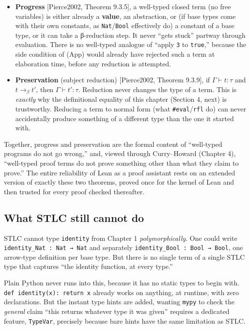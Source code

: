 \begin{itemize}
\tightlist
\item
  \textbf{Progress} {[}Pierce2002, Theorem 9.3.5{]}, a well-typed closed term (no free variables) is either already a \textbf{value}, an abstraction, or (if base types come with their own constants, as \texttt{Nat}/\texttt{Bool} effectively do) a constant of a base type, or it can take a β-reduction step. It never ``gets stuck'' partway through evaluation. There is no well-typed analogue of ``apply \texttt{3} to \texttt{true},'' because the side condition of (App) would already have rejected such a term at elaboration time, before any reduction is attempted.
\item
  \textbf{Preservation} (subject reduction) {[}Pierce2002, Theorem 9.3.9{]}, if \(\Gamma \vdash t : \tau\) and \(t \longrightarrow_\beta t'\), then \(\Gamma \vdash t' : \tau\). Reduction never changes the type of a term. This is \emph{exactly} why the definitional equality of this chapter (Section 4, next) is trustworthy. Reducing a term to normal form (what \texttt{\#eval}/\texttt{rfl} do) can never accidentally produce something of a different type than the one it started with.
\end{itemize}

Together, progress and preservation are the formal content of ``well-typed programs do not go wrong,'' and, viewed through Curry--Howard (Chapter 4), ``well-typed proof terms do not prove something other than what they claim to prove.'' The entire reliability of Lean as a proof assistant rests on an extended version of exactly these two theorems, proved once for the kernel of Lean and then trusted for every proof checked thereafter.

\subsection{What STLC still cannot do}\label{sec:06-rigor-check:03-typing-rules-and-safety:5}

STLC cannot type \texttt{identity} from Chapter 1 \emph{polymorphically}. One could write \texttt{identity\_\allowbreak{}Nat : Nat → Nat} and separately \texttt{identity\_\allowbreak{}Bool : Bool → Bool}, one arrow-type definition per base type. But there is no single term of a single STLC type that captures ``the identity function, at every type.''

\begin{progcorner}

Plain Python never runs into this, because it has no static types to begin with. \texttt{def identity(x): return x} already works on anything, at runtime, with zero declarations. But the instant type hints are added, wanting \texttt{mypy} to check the \emph{general} claim ``this returns whatever type it was given'' requires a dedicated feature, \texttt{TypeVar}, precisely because bare hints have the same limitation as STLC.

\end{progcorner}

